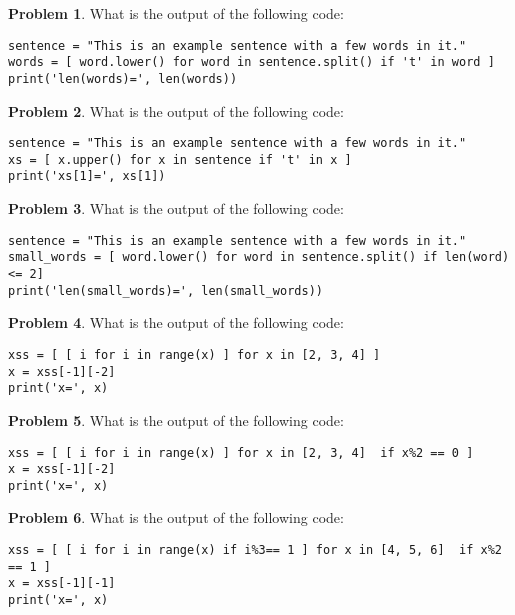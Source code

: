 \documentclass[10pt]{article}
\theoremstyle{definition}
\newtheorem{problem}{Problem}
\begin{document}
\begin{problem}
    What is the output of the following code:
\end{problem}
\begin{lstlisting}
sentence = "This is an example sentence with a few words in it."
words = [ word.lower() for word in sentence.split() if 't' in word ]
print('len(words)=', len(words))
\end{lstlisting}
\vspace{1.2in}


\begin{problem}
    What is the output of the following code:
\end{problem}
\begin{lstlisting}
sentence = "This is an example sentence with a few words in it."
xs = [ x.upper() for x in sentence if 't' in x ]
print('xs[1]=', xs[1])
\end{lstlisting}
\vspace{1.2in}


\begin{problem}
    What is the output of the following code:
\end{problem}
\begin{lstlisting}
sentence = "This is an example sentence with a few words in it."
small_words = [ word.lower() for word in sentence.split() if len(word) <= 2]
print('len(small_words)=', len(small_words))
\end{lstlisting}
\vspace{1.2in}


\newpage
\begin{problem}
    What is the output of the following code:
\end{problem}
\begin{lstlisting}
xss = [ [ i for i in range(x) ] for x in [2, 3, 4] ]
x = xss[-1][-2]
print('x=', x)
\end{lstlisting}
\vspace{3in}

\begin{problem}
    What is the output of the following code:
\end{problem}
\begin{lstlisting}
xss = [ [ i for i in range(x) ] for x in [2, 3, 4]  if x%2 == 0 ]
x = xss[-1][-2]
print('x=', x)
\end{lstlisting}
\vspace{2.0in}


\newpage
\begin{problem}
    What is the output of the following code:
\end{problem}
\begin{lstlisting}
xss = [ [ i for i in range(x) if i%3== 1 ] for x in [4, 5, 6]  if x%2 == 1 ]
x = xss[-1][-1]
print('x=', x)
\end{lstlisting}
\vspace{3.0in}
\end{document}

